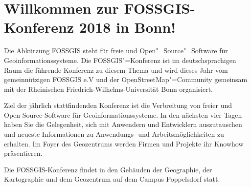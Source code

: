 \newpage
\section*{Willkommen zur FOSSGIS-Konferenz 2018 in Bonn!} \label{welcome}
Die Abkürzung FOSSGIS steht
für freie und Open"=Source"=Software für Geoinformationssysteme.
Die FOSSGIS"=Konferenz ist im deutschsprachigen Raum die führende Konferenz zu diesem Thema
und wird dieses Jahr vom gemeinnützigen FOSSGIS e.V und der OpenStreetMap"=Community
gemeinsam mit der Rheinischen Friedrich-Wilhelms-Universität Bonn organisiert.

Ziel der jährlich stattfindenden Konferenz ist die Verbreitung von freier und
Open-Source-Software für Geoinformationssysteme.  In den nächsten vier Tagen
haben Sie die Gelegenheit, sich mit Anwendern und Entwicklern auszutauschen und
neueste Informationen zu Anwendungs- und Arbeitsmöglichkeiten zu erhalten. Im
Foyer des Geozentrums werden Firmen und Projekte ihr Knowhow präsentieren.

Die FOSSGIS-Konferenz findet in den Gebäuden der Geographie, der Kartographie und dem Geozentrum auf dem Campus Poppelsdorf statt.

\newpage


